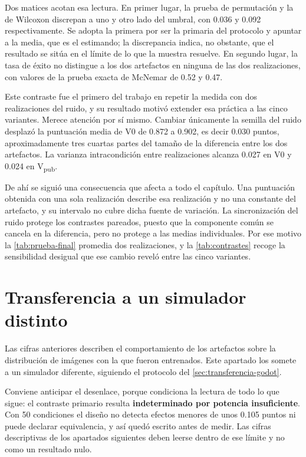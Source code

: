 Dos matices acotan esa lectura. En primer lugar, la prueba de permutaci\'on y la de Wilcoxon
discrepan a uno y otro lado del umbral, con \num{0.036} y \num{0.092} respectivamente. Se
adopta la primera por ser la primaria del protocolo y apuntar a la media, que es el
estimando; la discrepancia indica, no obstante, que el resultado se sit\'ua en el l\'imite de
lo que la muestra resuelve. En segundo lugar, la tasa de \'exito no distingue a los dos
artefactos en ninguna de las dos realizaciones, con valores de la prueba exacta de McNemar de
\num{0.52} y \num{0.47}.


Este contraste fue el primero del trabajo en repetir la medida con dos realizaciones del
ruido, y su resultado motiv\'o extender esa pr\'actica a las cinco variantes. Merece
atenci\'on por s\'i mismo. Cambiar \'unicamente la semilla del ruido desplaz\'o la
puntuaci\'on media de V0 de \num{0.872} a \num{0.902}, es decir \num{0.030} puntos,
aproximadamente tres cuartas partes del tama\~no de la diferencia entre los dos artefactos.
La varianza intracondici\'on entre realizaciones alcanza \num{0.027} en V0 y \num{0.024} en
V\textsubscript{pub}.

De ah\'i se sigui\'o una consecuencia que afecta a todo el cap\'itulo. Una puntuaci\'on
obtenida con una sola realizaci\'on describe esa realizaci\'on y no una constante del
artefacto, y su intervalo no cubre dicha fuente de variaci\'on. La sincronizaci\'on del
ruido protege los contrastes pareados, puesto que la componente com\'un se cancela en la
diferencia, pero no protege a las medias individuales. Por ese motivo la
\cref{tab:prueba-final} promedia dos realizaciones, y la \cref{tab:contrastes} recoge la
sensibilidad desigual que ese cambio revel\'o entre las cinco variantes.

\section{Transferencia a un simulador distinto}
\label{sec:resultado-godot}

Las cifras anteriores describen el comportamiento de los artefactos sobre la distribuci\'on
de im\'agenes con la que fueron entrenados. Este apartado los somete a un simulador
diferente, siguiendo el protocolo del \cref{sec:transferencia-godot}.

Conviene anticipar el desenlace, porque condiciona la lectura de todo lo que sigue: el
contraste primario resulta \textbf{indeterminado por potencia insuficiente}. Con \num{50}
condiciones el dise\~no no detecta efectos menores de unos \num{0.105} puntos ni puede
declarar equivalencia, y as\'i qued\'o escrito antes de medir. Las cifras descriptivas de los
apartados siguientes deben leerse dentro de ese l\'imite y no como un resultado nulo.

